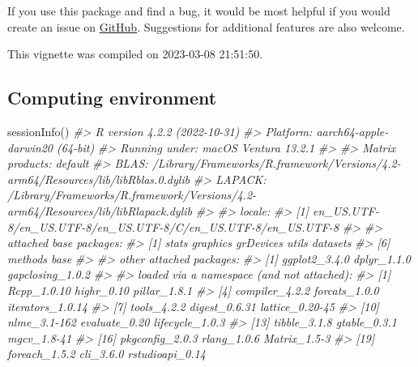 \documentclass[
]{article}
\newenvironment{Shaded}{\begin{snugshade}}{\end{snugshade}}
\newcommand{\CommentTok}[1]{\textcolor[rgb]{0.56,0.35,0.01}{\textit{#1}}}
\newcommand{\FunctionTok}[1]{\textcolor[rgb]{0.00,0.00,0.00}{#1}}
\newcommand{\NormalTok}[1]{#1}
\begin{document}
If you use this package and find a bug, it would be most helpful if you would create an issue on \href{https://github.com/ilundberg/gapclosing}{GitHub}. Suggestions for additional features are also welcome.

This vignette was compiled on 2023-03-08 21:51:50.

\hypertarget{computing-environment}{%
\subsection{Computing environment}\label{computing-environment}}

\begin{Shaded}
\begin{Highlighting}[]
\FunctionTok{sessionInfo}\NormalTok{()}
\CommentTok{\#\textgreater{} R version 4.2.2 (2022{-}10{-}31)}
\CommentTok{\#\textgreater{} Platform: aarch64{-}apple{-}darwin20 (64{-}bit)}
\CommentTok{\#\textgreater{} Running under: macOS Ventura 13.2.1}
\CommentTok{\#\textgreater{} }
\CommentTok{\#\textgreater{} Matrix products: default}
\CommentTok{\#\textgreater{} BLAS:   /Library/Frameworks/R.framework/Versions/4.2{-}arm64/Resources/lib/libRblas.0.dylib}
\CommentTok{\#\textgreater{} LAPACK: /Library/Frameworks/R.framework/Versions/4.2{-}arm64/Resources/lib/libRlapack.dylib}
\CommentTok{\#\textgreater{} }
\CommentTok{\#\textgreater{} locale:}
\CommentTok{\#\textgreater{} [1] en\_US.UTF{-}8/en\_US.UTF{-}8/en\_US.UTF{-}8/C/en\_US.UTF{-}8/en\_US.UTF{-}8}
\CommentTok{\#\textgreater{} }
\CommentTok{\#\textgreater{} attached base packages:}
\CommentTok{\#\textgreater{} [1] stats     graphics  grDevices utils     datasets }
\CommentTok{\#\textgreater{} [6] methods   base     }
\CommentTok{\#\textgreater{} }
\CommentTok{\#\textgreater{} other attached packages:}
\CommentTok{\#\textgreater{} [1] ggplot2\_3.4.0    dplyr\_1.1.0      gapclosing\_1.0.2}
\CommentTok{\#\textgreater{} }
\CommentTok{\#\textgreater{} loaded via a namespace (and not attached):}
\CommentTok{\#\textgreater{}  [1] Rcpp\_1.0.10       highr\_0.10        pillar\_1.8.1     }
\CommentTok{\#\textgreater{}  [4] compiler\_4.2.2    forcats\_1.0.0     iterators\_1.0.14 }
\CommentTok{\#\textgreater{}  [7] tools\_4.2.2       digest\_0.6.31     lattice\_0.20{-}45  }
\CommentTok{\#\textgreater{} [10] nlme\_3.1{-}162      evaluate\_0.20     lifecycle\_1.0.3  }
\CommentTok{\#\textgreater{} [13] tibble\_3.1.8      gtable\_0.3.1      mgcv\_1.8{-}41      }
\CommentTok{\#\textgreater{} [16] pkgconfig\_2.0.3   rlang\_1.0.6       Matrix\_1.5{-}3     }
\CommentTok{\#\textgreater{} [19] foreach\_1.5.2     cli\_3.6.0         rstudioapi\_0.14  }

\end{Highlighting}
\end{Shaded}
\end{document}
